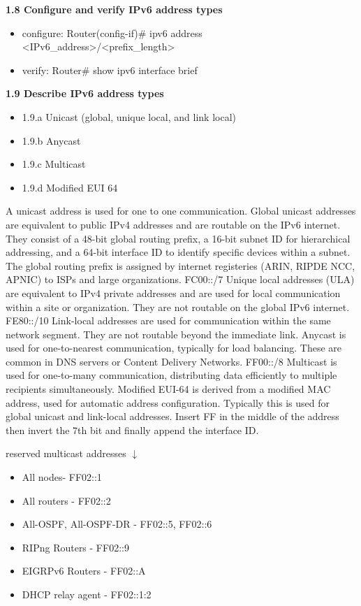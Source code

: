 \documentclass{article}
\begin{document}
\textbf{1.8 Configure and verify IPv6 address types}
\begin{itemize}
\item configure: Router(config-if)\# ipv6 address \textless IPv6\_address\textgreater/\textless prefix\_length\textgreater
\item verify: Router\# show ipv6 interface brief
 \end{itemize}
  
\textbf{1.9 Describe IPv6 address types}
\begin{itemize}
\item 1.9.a Unicast (global, unique local, and link local)
\item 1.9.b Anycast
\item 1.9.c Multicast
\item 1.9.d Modified EUI 64
\end{itemize}

	A unicast address is used for one to one communication. Global unicast addresses are equivalent to public IPv4 addresses and are routable on the IPv6 internet. They consist of a 48-bit global routing prefix, a 16-bit subnet ID for hierarchical addressing, and a 64-bit interface ID to identify specific devices within a subnet. The global routing prefix is assigned by internet registeries (ARIN, RIPDE NCC, APNIC) to ISPs and large organizations. FC00::/7 Unique local addresses (ULA) are equivalent to IPv4 private addresses and are used for local communication within a site or organization. They are not routable on the global IPv6 internet. FE80::/10 Link-local addresses are used for communication within the same network segment. They are not routable beyond the immediate link. Anycast is used for one-to-nearest communication, typically for load balancing. These are common in DNS servers or Content Delivery Networks. FF00::/8 Multicast is used for one-to-many communication, distributing data efficiently to multiple recipients simultaneously. Modified EUI-64 is derived from a modified MAC address, used for automatic address configuration. Typically this is used for global unicast and link-local addresses. Insert FF in the middle of the address then invert the 7th bit and finally append the interface ID.

reserved multicast addresses $\downarrow$
\begin{itemize}
\item All nodes- FF02::1
\item All routers - FF02::2
\item All-OSPF, All-OSPF-DR - FF02::5, FF02::6
\item RIPng Routers - FF02::9
\item EIGRPv6 Routers - FF02::A
\item DHCP relay agent - FF02::1:2
\end{itemize}
\end{document}
